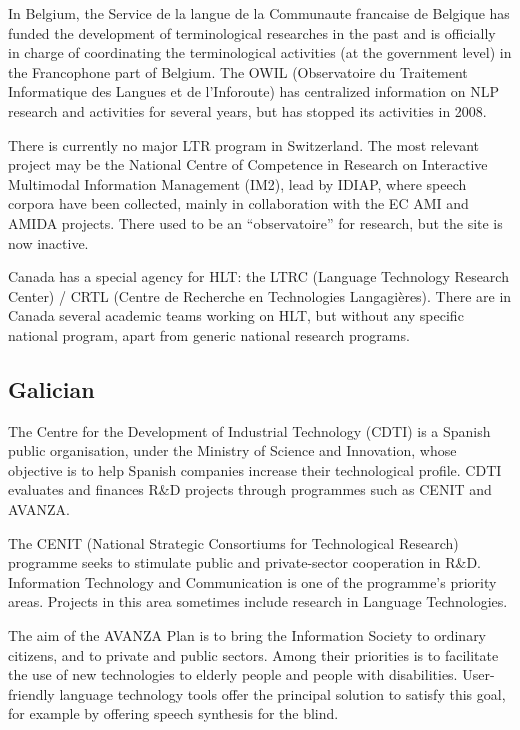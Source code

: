\documentclass[10pt, plain]{../../metanetpaper}
\begin{document}
\begin{multicols}{2}
In Belgium, the Service de la langue de la Communaute francaise de Belgique has funded the development of terminological researches in the past and is officially in charge of coordinating the terminological activities (at the government level) in the Francophone part of Belgium. The OWIL (Observatoire du Traitement Informatique des Langues et de l’Inforoute) has centralized information on NLP research and activities for several years, but has stopped its activities in 2008.

There is currently no major LTR program in Switzerland.  The most relevant project may be the National Centre of Competence in Research on Interactive Multimodal Information Management (IM2), lead by IDIAP, where speech corpora have been collected, mainly in collaboration with the EC AMI and AMIDA projects. There used to be an “observatoire” for research, but the site is now inactive. 

Canada has a special agency for HLT: the LTRC (Language Technology Research Center) / CRTL (Centre de Recherche en Technologies Langagières). There are in Canada several academic teams working on HLT, but without any specific national program, apart from generic national research programs.

\subsection*{Galician}
\label{sec:galician}

The Centre for the Development of Industrial Technology (CDTI) is a Spanish public organisation, under the Ministry of Science and Innovation, whose objective is to help Spanish companies increase their technological profile. CDTI evaluates and finances R\&D projects through programmes such as CENIT and AVANZA.

The CENIT (National Strategic Consortiums for Technological Research) programme seeks to stimulate public and private-sector cooperation in R\&D. Information Technology and Communication is one of the programme’s priority areas. Projects in this area sometimes include research in Language Technologies.

The aim of the AVANZA Plan is to bring the Information Society to ordinary citizens, and to private and public sectors. Among their priorities is to facilitate the use of new technologies to elderly people and people with disabilities. User-friendly language technology tools offer the principal solution to satisfy this goal, for example by offering speech synthesis for the blind.


\end{multicols}
\end{document}
